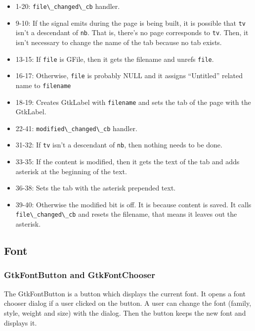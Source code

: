 \begin{itemize}
\tightlist
\item
  1-20: \passthrough{\lstinline!file\_changed\_cb!} handler.
\item
  9-10: If the signal emits during the page is being built, it is
  possible that \passthrough{\lstinline!tv!} isn't a descendant of
  \passthrough{\lstinline!nb!}. That is, there's no page corresponds to
  \passthrough{\lstinline!tv!}. Then, it isn't necessary to change the
  name of the tab because no tab exists.
\item
  13-15: If \passthrough{\lstinline!file!} is GFile, then it gets the
  filename and unrefs \passthrough{\lstinline!file!}.
\item
  16-17: Otherwise, \passthrough{\lstinline!file!} is probably NULL and
  it assigns ``Untitled'' related name to
  \passthrough{\lstinline!filename!}
\item
  18-19: Creates GtkLabel with \passthrough{\lstinline!filename!} and
  sets the tab of the page with the GtkLabel.
\item
  22-41: \passthrough{\lstinline!modified\_changed\_cb!} handler.
\item
  31-32: If \passthrough{\lstinline!tv!} isn't a descendant of
  \passthrough{\lstinline!nb!}, then nothing needs to be done.
\item
  33-35: If the content is modified, then it gets the text of the tab
  and adds asterisk at the beginning of the text.
\item
  36-38: Sets the tab with the asterisk prepended text.
\item
  39-40: Otherwise the modified bit is off. It is because content is
  saved. It calls \passthrough{\lstinline!file\_changed\_cb!} and resets
  the filename, that means it leaves out the asterisk.
\end{itemize}

\hypertarget{font}{%
\subsection{Font}\label{font}}

\hypertarget{gtkfontbutton-and-gtkfontchooser}{%
\subsubsection{GtkFontButton and
GtkFontChooser}\label{gtkfontbutton-and-gtkfontchooser}}

The GtkFontButton is a button which displays the current font. It opens
a font chooser dialog if a user clicked on the button. A user can change
the font (family, style, weight and size) with the dialog. Then the
button keeps the new font and displays it.

